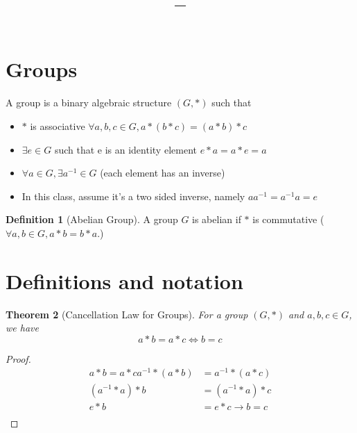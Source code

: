 \documentclass[11pt]{article}
\title{\vspace{-1.5em}\textbf{\coursename -- \lecturetitle}}
\author{\studentname}
\date{\lecturedate}
\newcommand{\1}{\mathbf{1}}
\theoremstyle{notestyle}
\newtheorem{theorem}{Theorem}[section]
\theoremstyle{definition}
\newtheorem{definition}[theorem]{Definition}
\begin{document}
\maketitle

\section{Groups}
A group is a binary algebraic structure $(G, *)$ such that 

\begin{itemize}
    \item $*$ is associative $\forall a, b, c \in G, a * (b * c) = (a * b) * c$
    \item $\exists e \in G$ such that e is an identity element $e * a = a * e = a$
    \item $\forall a \in G,  \exists a^{-1} \in G$ (each element has an inverse)
    \item In this class, assume it's a two sided inverse, namely $a a^{-1} = a^{-1} a = e$
\end{itemize}
\begin{definition}[Abelian Group]
\label{def:label}
A group $G$ is abelian if $*$ is commutative ($\forall a, b \in G,  a * b = b * a.$)
\end{definition}
\section{Definitions and notation}
\begin{theorem}[Cancellation Law for Groups]
\label{thm:label}
For a group $(G, *)$ and $a, b, c \in G$, we have $$a * b = a * c \iff b = c$$
\end{theorem}
\begin{proof}
\begin{align*}
    a * b = a * c 
    a^{-1} * (a * b) &= a^{-1} * (a * c)\\
 (a^{-1} * a) * b &= (a^{-1} * a) * c\\ 
 e * b &= e * c \rightarrow b = c\\ 
\end{align*}
\end{proof}
\end{document}
